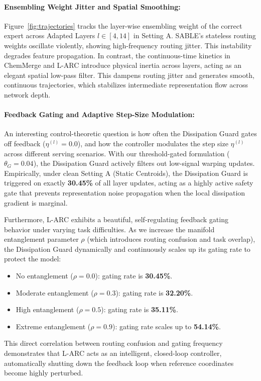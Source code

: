 \paragraph{Ensembling Weight Jitter and Spatial Smoothing:} 
Figure~\ref{fig:trajectories} tracks the layer-wise ensembling weight of the correct expert across Adapted Layers $l \in [4, 14]$ in Setting A. SABLE's stateless routing weights oscillate violently, showing high-frequency routing jitter. This instability degrades feature propagation. In contrast, the continuous-time kinetics in ChemMerge and L-ARC introduce physical inertia across layers, acting as an elegant spatial low-pass filter. This dampens routing jitter and generates smooth, continuous trajectories, which stabilizes intermediate representation flow across network depth.

\paragraph{Feedback Gating and Adaptive Step-Size Modulation:}
An interesting control-theoretic question is how often the Dissipation Guard gates off feedback ($\eta^{(l)} = 0.0$), and how the controller modulates the step size $\eta^{(l)}$ across different serving scenarios. 
With our threshold-gated formulation ($\theta_G = 0.04$), the Dissipation Guard actively filters out low-signal warping updates. Empirically, under clean Setting A (Static Centroids), the Dissipation Guard is triggered on exactly \textbf{30.45\%} of all layer updates, acting as a highly active safety gate that prevents representation noise propagation when the local dissipation gradient is marginal.

Furthermore, L-ARC exhibits a beautiful, self-regulating feedback gating behavior under varying task difficulties. As we increase the manifold entanglement parameter $\rho$ (which introduces routing confusion and task overlap), the Dissipation Guard dynamically and continuously scales up its gating rate to protect the model:
\begin{itemize}
    \item No entanglement ($\rho = 0.0$): gating rate is \textbf{30.45\%}.
    \item Moderate entanglement ($\rho = 0.3$): gating rate is \textbf{32.20\%}.
    \item High entanglement ($\rho = 0.5$): gating rate is \textbf{35.11\%}.
    \item Extreme entanglement ($\rho = 0.9$): gating rate scales up to \textbf{54.14\%}.
\end{itemize}
This direct correlation between routing confusion and gating frequency demonstrates that L-ARC acts as an intelligent, closed-loop controller, automatically shutting down the feedback loop when reference coordinates become highly perturbed.

